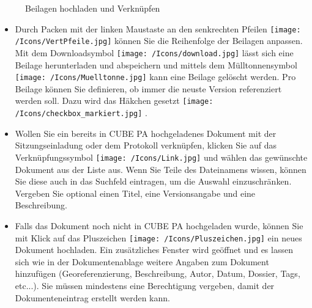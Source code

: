 \vspace{\baselineskip}

\begin{figure}[H]
\caption{Beilagen hochladen und Verknüpfen}
\end{figure}


\begin{itemize}
\item 
Durch Packen mit der linken Maustaste an den senkrechten Pfeilen \texttt{[image: /Icons/VertPfeile.jpg]}  können Sie die Reihenfolge der Beilagen anpassen. Mit dem Downloadsymbol \texttt{[image: /Icons/download.jpg]}  lässt sich eine Beilage herunterladen und abspeichern und mittels dem Mülltonnensymbol \texttt{[image: /Icons/Muelltonne.jpg]}  kann eine Beilage gelöscht werden. Pro Beilage können Sie definieren, ob immer die neuste Version referenziert werden soll. Dazu wird das Häkchen gesetzt \texttt{[image: /Icons/checkbox\_markiert.jpg]} .
\item 
Wollen Sie ein bereits in CUBE PA hochgeladenes Dokument mit der Sitzungseinladung oder dem Protokoll verknüpfen, klicken Sie auf das Verknüpfungssymbol \texttt{[image: /Icons/Link.jpg]}  und wählen das gewünschte Dokument aus der Liste aus. Wenn Sie Teile des Dateinamens wissen, können Sie diese auch in das Suchfeld eintragen, um die Auswahl einzuschränken. Vergeben Sie optional einen Titel, eine Versionsangabe und eine Beschreibung.
\item 
Falls das Dokument noch nicht in CUBE PA hochgeladen wurde, können Sie mit Klick auf das Pluszeichen \texttt{[image: /Icons/Pluszeichen.jpg]}  ein neues Dokument hochladen. Ein zusätzliches Fenster wird geöffnet und es lassen sich wie in der Dokumentenablage weitere Angaben zum Dokument hinzufügen (Georeferenzierung, Beschreibung, Autor, Datum, Dossier, Tags, etc...). Sie müssen mindestens eine Berechtigung vergeben, damit der Dokumenteneintrag erstellt werden kann.
\end{itemize}


